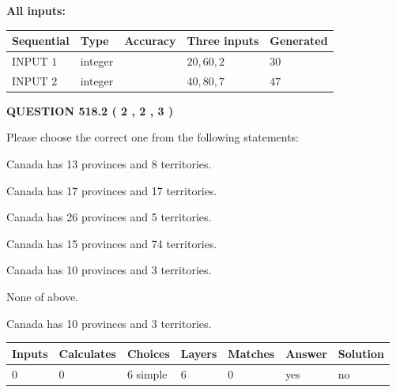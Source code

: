\documentclass[12pt]{article}
\begin{document}
   
   
   
\noindent\vspace{0.1in}\hspace{-0.08in} {\textbf{\Large{All inputs: }}}
   
   
  
  
\noindent\begin{tabular}{|l|l|l|l|l|}
\hline
 Sequential & Type & Accuracy & Three inputs & Generated \\ 
\hline
 
 
  INPUT $  1 $ & integer &  & $
 20
 , 
 60
 , 
 2
 $ & $ 30 $ 
 \\  \hline  
 
 
  INPUT $  2 $ & integer &  & $
 40
 , 
 80
 , 
 7
 $ & $ 47 $ 
 \\  \hline  
 \end{tabular}
   
   
  
\vspace{0.2in}
  
{\textbf{\Large{QUESTION
518.2 
 ( 2 , 2 , 3 )
}}}
  
  
Please choose the correct one from the following statements:
 
 
Canada has  13 provinces and  8 territories.
 
 
Canada has  17 provinces and  17 territories.
 
 
Canada has  26 provinces and  5 territories.
 
 
Canada has  15 provinces and  74 territories.
 
 
Canada has 10  provinces and 3 territories.
 
 
 None of above.
 
 
\noindent{}
 
 
Canada has 10  provinces and 3 territories.
 
 
\noindent{}
 
 
   
   
   
   
\noindent\begin{tabular}{|l|l|l|l|l|l|l|}
 \hline
Inputs & Calculates & Choices & Layers & Matches & Answer & Solution \\ \hline
 0  & 
 0  & 
 6
  simple  
  & 
 6  & 
 0  & 
  yes & 
  no 
  \\ \hline
 \end{tabular}
   
\end{document}
